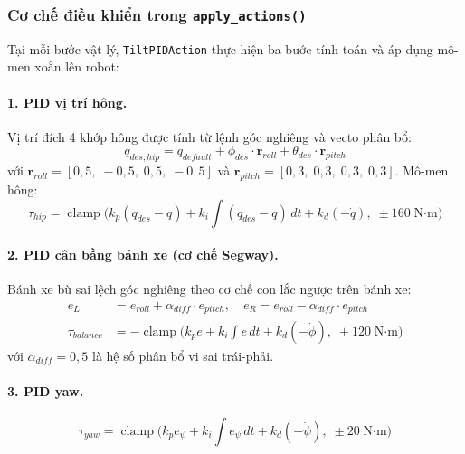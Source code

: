 \subsubsection{Cơ chế điều khiển trong \texttt{apply\_actions()}}

Tại mỗi bước vật lý, \texttt{TiltPIDAction} thực hiện ba bước tính toán
và áp dụng mô-men xoắn lên robot:

\paragraph{1. PID vị trí hông.}
Vị trí đích 4 khớp hông được tính từ lệnh góc nghiêng và vecto phân bổ:
\begin{equation}
    q_{des,hip} = q_{default} + \phi_{des} \cdot \mathbf{r}_{roll}
                  + \theta_{des} \cdot \mathbf{r}_{pitch}
    \label{eq:hip_des}
\end{equation}
với $\mathbf{r}_{roll} = [0{,}5,\;{-}0{,}5,\;0{,}5,\;{-}0{,}5]$ và
$\mathbf{r}_{pitch} = [0{,}3,\;0{,}3,\;0{,}3,\;0{,}3]$.
Mô-men hông:
\begin{equation}
    \tau_{hip} = \operatorname{clamp}\!\bigl(
        k_p (q_{des} - q) + k_i \int(q_{des}-q)\,dt + k_d(-\dot{q}),\;
        \pm 160\;\text{N·m}\bigr)
    \label{eq:hip_pid}
\end{equation}

\paragraph{2. PID cân bằng bánh xe (cơ chế Segway).}
Bánh xe bù sai lệch góc nghiêng theo cơ chế con lắc ngược trên bánh xe:
\begin{align}
    e_L &= e_{roll} + \alpha_{diff} \cdot e_{pitch}, \quad
    e_R = e_{roll} - \alpha_{diff} \cdot e_{pitch}
    \label{eq:wheel_err} \\
    \tau_{balance} &= -\operatorname{clamp}\!\bigl(
        k_p e + k_i \int e\,dt + k_d (-\dot{\phi}),\;
        \pm 120\;\text{N·m}\bigr)
    \label{eq:wheel_balance}
\end{align}
với $\alpha_{diff} = 0{,}5$ là hệ số phân bổ vi sai trái-phải.

\paragraph{3. PID yaw.}
\begin{equation}
    \tau_{yaw} = \operatorname{clamp}\!\bigl(
        k_p e_\psi + k_i \int e_\psi\,dt + k_d(-\dot{\psi}),\;
        \pm 20\;\text{N·m}\bigr)
    \label{eq:yaw_pid}
\end{equation}

